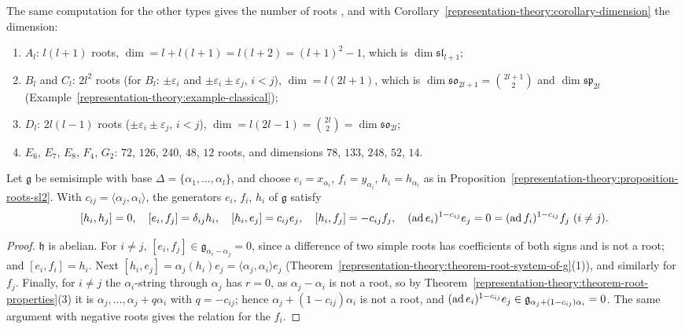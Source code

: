 \begin{example}
The same computation for the other types gives the number of roots \cite[Section 12.1]{humphreys-lie}, and with Corollary~\ref{representation-theory:corollary-dimension} the
dimension:
\begin{enumerate}
\item $A_l$: $l(l + 1)$ roots, $\dim = l + l(l + 1) = l(l + 2) = (l + 1)^2 - 1$, which is $\dim\mathfrak{sl}_{l+1}$;
\item $B_l$ and $C_l$: $2l^2$ roots (for $B_l$: $\pm\varepsilon_i$ and $\pm\varepsilon_i \pm \varepsilon_j$, $i < j$), $\dim = l(2l + 1)$, which is $\dim\mathfrak{so}_{2l+1} = \binom{2l+1}{2}$ and
$\dim\mathfrak{sp}_{2l}$ (Example~\ref{representation-theory:example-classical});
\item $D_l$: $2l(l - 1)$ roots ($\pm\varepsilon_i \pm \varepsilon_j$, $i < j$), $\dim = l(2l - 1) = \binom{2l}{2} = \dim\mathfrak{so}_{2l}$;
\item $E_6$, $E_7$, $E_8$, $F_4$, $G_2$: $72$, $126$, $240$, $48$, $12$ roots, and dimensions $78$, $133$, $248$, $52$, $14$.
\end{enumerate}
\end{example}

\begin{proposition}\label{representation-theory:proposition-serre-relations}
Let $\mathfrak{g}$ be semisimple with base $\Delta = \{\alpha_1, \ldots, \alpha_l\}$, and choose $e_i = x_{\alpha_i}$, $f_i = y_{\alpha_i}$, $h_i = h_{\alpha_i}$ as in
Proposition~\ref{representation-theory:proposition-roots-sl2}. With $c_{ij} = \langle\alpha_j, \alpha_i\rangle$, the generators $e_i$, $f_i$, $h_i$ of $\mathfrak{g}$ satisfy
\[
[h_i, h_j] = 0, \quad [e_i, f_j] = \delta_{ij}h_i, \quad [h_i, e_j] = c_{ij}e_j, \quad [h_i, f_j] = -c_{ij}f_j, \quad (\operatorname{ad} e_i)^{1 - c_{ij}}e_j = 0 = (\operatorname{ad} f_i)^{1 - c_{ij}}f_j \ (i \neq j).
\]
\end{proposition}

\begin{proof}
$\mathfrak{h}$ is abelian. For $i \neq j$, $[e_i, f_j] \in \mathfrak{g}_{\alpha_i - \alpha_j} = 0$, since a difference of two simple roots has coefficients of both signs and is not a root; and
$[e_i, f_i] = h_i$. Next $[h_i, e_j] = \alpha_j(h_i)e_j = \langle\alpha_j, \alpha_i\rangle e_j$ (Theorem~\ref{representation-theory:theorem-root-system-of-g}(1)), and similarly for $f_j$. Finally, for $i \neq j$
the $\alpha_i$-string through $\alpha_j$ has $r = 0$, as $\alpha_j - \alpha_i$ is not a root, so by Theorem~\ref{representation-theory:theorem-root-properties}(3) it is $\alpha_j, \ldots, \alpha_j + q\alpha_i$
with $q = -c_{ij}$; hence $\alpha_j + (1 - c_{ij})\alpha_i$ is not a root, and $(\operatorname{ad} e_i)^{1 - c_{ij}}e_j \in \mathfrak{g}_{\alpha_j + (1 - c_{ij})\alpha_i} = 0$. The same argument with negative roots gives
the relation for the $f_i$.
\end{proof}

